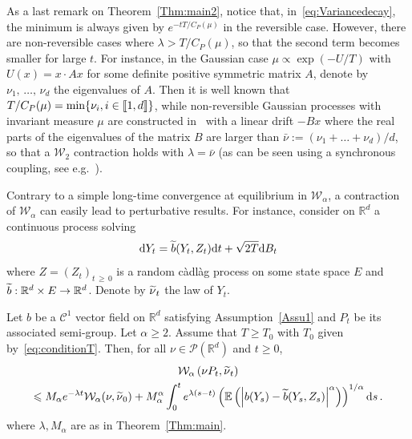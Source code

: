 \documentclass[10pt]{amsart}
\theoremstyle{definition}\newtheorem{defi}[theo]{Definition}\newtheorem{rema}[theo]{Remark}\newtheorem{exam}[theo]{Example}\newtheorem{exem}[theo]{Example}\newtheorem{nota}[theo]{Notation}
\newcommand{\llbracket}{\mathopen{[\mkern -2.7mu[}}
\newcommand{\rrbracket}{\mathclose{]\mkern -2.7mu]}}
\newcommand{\R}{\mathbb R}
\newcommand{\bbE}{\mathbb E}
\newcommand{\clP}{\mathcal P}
\newcommand{\clC}{\mathcal C}
\newcommand{\clW}{\mathcal W}
\newcommand{\dd}{\mathrm{d}}
\newcommand{\1}{\mathbbm{1}}
\let\oldtilde\tilde
\renewcommand*{\tilde}[1]{\mathchoice{\widetilde{#1}}{\widetilde{#1}}{\oldtilde{#1}}{\oldtilde{#1}}}
\providecommand{\llbracket}{\mathopen{[\mkern-2.7mu[}}\providecommand{\rrbracket}{\mathclose{]\mkern-2.7mu]}}
\begin{document}
As a last remark on Theorem~\ref{Thm:main2}, notice that, in~\eqref{eq:Variancedecay}, the minimum is always given by $e^{-tT/C_P(\mu)}$ in the reversible case. However, there are non-reversible cases where $\lambda> T/C_P(\mu)$, so that the second term becomes smaller for large $t$. For instance, in the Gaussian case $\mu \propto \exp(- U/T)$ with $U(x) = x\cdot Ax$ for some definite positive symmetric matrix $A$, denote by $\nu_1,\,\dots,\,\nu_d$ the eigenvalues of $A$. Then it is well known that $T/C_P(\mu) = \min\{ \nu_i,i\in\llbracket 1,d\rrbracket\}$, while non-reversible Gaussian processes with invariant measure $\mu$ are constructed in~\cite{Lelievre2012} with a linear drift $-Bx$ where the real parts of the eigenvalues of the matrix $B$ are larger than $\bar\nu := (\nu_1+\dots+\nu_d)/d$, so that a $\clW_2$ contraction holds with $\lambda = \bar\nu$ (as can be seen using a synchronous coupling, see e.g.~\cite{MonmarcheContraction}).


Contrary to a simple long-time convergence at equilibrium in $\clW_\alpha$, a contraction of $\clW_\alpha$ can easily lead to perturbative results. For instance, consider on $\R^d$ a continuous process solving
\begin{equation}\label{eq:EDSpertubée}
\dd Y_t = \tilde b(Y_t,Z_t) \dd t + \sqrt{2T}\dd B_t
\end{equation}
where $Z=(Z_t)_{t\,\geqslant\,0}$ is a random càdlàg process on some state space $E$ and $\tilde b :\R^d\times E\linebreak\rightarrow \R^d$. Denote by $\tilde\nu_t$ the law of $Y_t$.

\begin{prop}\label{prop:perturbation}
Let $b$ be a $\clC^1$ vector field on $\R^d$ satisfying Assumption~\ref{Assu1} and $P_t$ be its associated semi-group. Let $\alpha\geqslant 2$. Assume that $T\geqslant T_0$ with $T_0$ given by~\eqref{eq:conditionT}. Then, for all $\nu\in\clP(\R^d)$ and $t\geqslant 0$,
\begin{multline}\label{eq:perturb}
\clW_\alpha\left(\nu P_t,\tilde \nu_t\right) \\
\leqslant M_\alpha e^{-\lambda t} \clW_\alpha(\nu,\tilde \nu_0)+ M_\alpha^\alpha \int_0^t e^{\lambda (s-t)} \left( \bbE \left( \left| b(Y_s) - \tilde b(Y_s,Z_s)\right|^\alpha\right)\right)^{1/\alpha}\dd s\,.
\end{multline}
where $\lambda,M_\alpha$ are as in Theorem~\ref{Thm:main}.
\end{prop}
\end{document}
